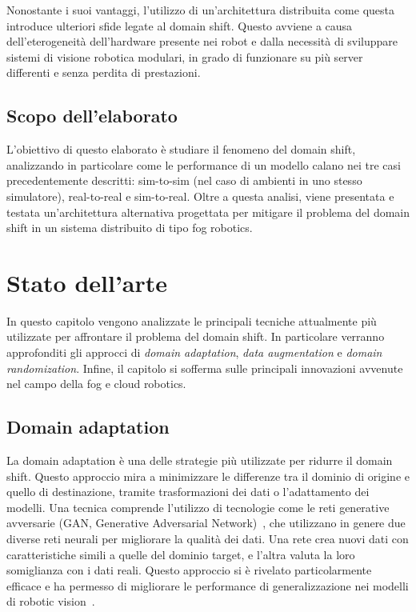 \documentclass[12pt]{report}
\begin{document}
Nonostante i suoi vantaggi, l'utilizzo di un'architettura distribuita come questa introduce ulteriori sfide legate al domain shift. Questo avviene a causa dell'eterogeneità dell'hardware presente nei robot e dalla necessità di sviluppare sistemi di visione robotica modulari, in grado di funzionare su più server differenti e senza perdita di prestazioni.

\section{Scopo dell'elaborato}
\label{sec:scopo_dell_elaborato}

L'obiettivo di questo elaborato è studiare il fenomeno del domain shift, analizzando in particolare come le performance di un modello calano nei tre casi precedentemente descritti: sim-to-sim (nel caso di ambienti in uno stesso simulatore), real-to-real e sim-to-real. Oltre a questa analisi, viene presentata e testata un'architettura alternativa progettata per mitigare il problema del domain shift in un sistema distribuito di tipo fog robotics.

\chapter{Stato dell'arte}
\label{chap:stato_arte}

In questo capitolo vengono analizzate le principali tecniche attualmente più utilizzate per affrontare il problema del domain shift. In particolare verranno approfonditi gli approcci di \textit{domain adaptation}, \textit{data augmentation} e \textit{domain randomization}. Infine, il capitolo si sofferma sulle principali innovazioni avvenute nel campo della fog e cloud robotics.

\section{Domain adaptation}
\label{sec:adaptation}

La domain adaptation è una delle strategie più utilizzate per ridurre il domain shift. Questo approccio mira a minimizzare le differenze tra il dominio di origine e quello di destinazione, tramite trasformazioni dei dati o l'adattamento dei modelli. Una tecnica comprende l'utilizzo di tecnologie come le reti generative avversarie (GAN, Generative Adversarial Network)~\cite{10.1145/3422622}, che utilizzano in genere due diverse reti neurali per migliorare la qualità dei dati. Una rete crea nuovi dati con caratteristiche simili a quelle del dominio target, e l'altra valuta la loro somiglianza con i dati reali. Questo approccio si è rivelato particolarmente efficace e ha permesso di migliorare le performance di generalizzazione nei modelli di robotic vision~\cite{Shrivastava_2017_CVPR}.
\end{document}
